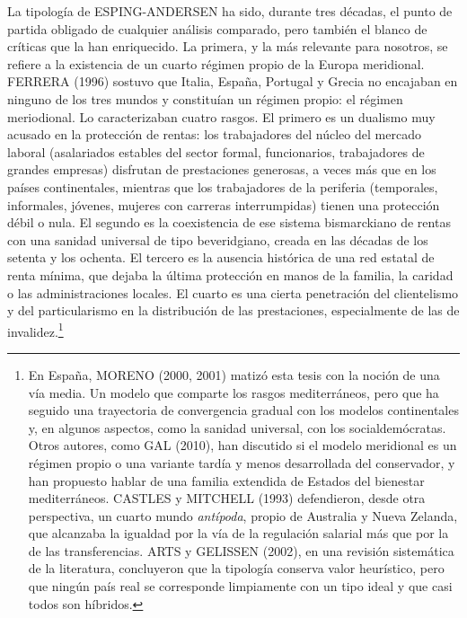 \documentclass[10pt,a4paper]{article}
\begin{document}
La tipología de ESPING-ANDERSEN ha sido, durante tres décadas, el punto de partida obligado de cualquier análisis comparado, pero también el blanco de críticas que la han enriquecido. La primera, y la más relevante para nosotros, se refiere a la existencia de un cuarto régimen propio de la Europa meridional. FERRERA (1996) sostuvo que Italia, España, Portugal y Grecia no encajaban en ninguno de los tres mundos y constituían un régimen propio: el régimen meriodional. Lo caracterizaban cuatro rasgos. El primero es un dualismo muy acusado en la protección de rentas: los trabajadores del núcleo del mercado laboral (asalariados estables del sector formal, funcionarios, trabajadores de grandes empresas) disfrutan de prestaciones generosas, a veces más que en los países continentales, mientras que los trabajadores de la periferia (temporales, informales, jóvenes, mujeres con carreras interrumpidas) tienen una protección débil o nula. El segundo es la coexistencia de ese sistema bismarckiano de rentas con una sanidad universal de tipo beveridgiano, creada en las décadas de los setenta y los ochenta. El tercero es la ausencia histórica de una red estatal de renta mínima, que dejaba la última protección en manos de la familia, la caridad o las administraciones locales. El cuarto es una cierta penetración del clientelismo y del particularismo en la distribución de las prestaciones, especialmente de las de invalidez.\footnote{%
    En España, MORENO (2000, 2001) matizó esta tesis con la noción de una vía media. Un modelo que comparte los rasgos mediterráneos, pero que ha seguido una trayectoria de convergencia gradual con los modelos continentales y, en algunos aspectos, como la sanidad universal, con los socialdemócratas. Otros autores, como GAL (2010), han discutido si el modelo meridional es un régimen propio o una variante tardía y menos desarrollada del conservador, y han propuesto hablar de una familia extendida de Estados del bienestar mediterráneos. CASTLES y MITCHELL (1993) defendieron, desde otra perspectiva, un cuarto mundo \textit{antípoda}, propio de Australia y Nueva Zelanda, que alcanzaba la igualdad por la vía de la regulación salarial más que por la de las transferencias. ARTS y GELISSEN (2002), en una revisión sistemática de la literatura, concluyeron que la tipología conserva valor heurístico, pero que ningún país real se corresponde limpiamente con un tipo ideal y que casi todos son híbridos.
}
\end{document}
